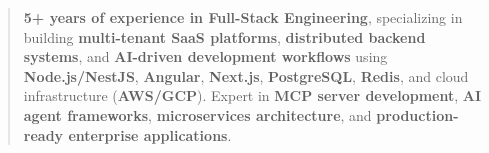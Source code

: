 \documentclass[10pt,a4paper,ragged2e,withhyper]{altacv}
\begin{document}


\makecvheader

\begin{quote}
\textbf{5+ years of experience in Full-Stack Engineering}, specializing in building \textbf{multi-tenant SaaS platforms}, \textbf{distributed backend systems}, and \textbf{AI-driven development workflows} using \textbf{Node.js/NestJS}, \textbf{Angular}, \textbf{Next.js}, \textbf{PostgreSQL}, \textbf{Redis}, and cloud infrastructure (\textbf{AWS/GCP}). Expert in \textbf{MCP server development}, \textbf{AI agent frameworks}, \textbf{microservices architecture}, and \textbf{production-ready enterprise applications}.
\end{quote}

\medskip
\end{document}
